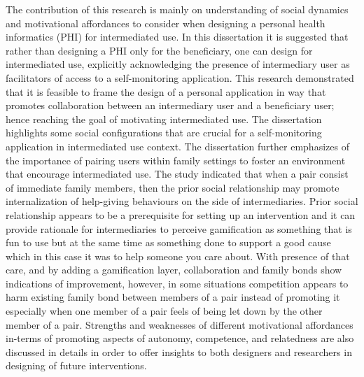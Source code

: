 The contribution of this research is mainly on understanding of social dynamics and motivational affordances to consider when designing a personal health informatics (PHI) for intermediated use. In this dissertation it is suggested that rather than designing a PHI only for the beneficiary, one can design for intermediated use, explicitly acknowledging the presence of intermediary user as facilitators of access to a self-monitoring application. This research demonstrated that it is feasible to frame the design of a personal application in way that promotes collaboration between an intermediary user and a beneficiary user; hence reaching the goal of motivating intermediated use. The dissertation highlights some social configurations that are crucial for a self-monitoring application in intermediated use context. The dissertation further emphasizes of the importance of pairing users within family settings to foster an environment that encourage intermediated use.  The study indicated that when a pair consist of immediate family members, then the prior social relationship may promote internalization of help-giving behaviours on the side of intermediaries. Prior social relationship appears to be a prerequisite for setting up an intervention and it can provide rationale for intermediaries to perceive gamification as something that is fun to use but at the same time as something done to support a good cause which in this case it was to help someone you care about. With presence of that care, and by adding a gamification layer,  collaboration and family bonds show indications of improvement, however, in some situations competition appears to harm existing family bond between members of a pair instead of promoting it especially when one member of a pair feels of being let down by the other member of a pair. Strengths and weaknesses of different motivational affordances in-terms of promoting aspects of autonomy, competence, and relatedness are also discussed in details in order to offer insights to both designers and researchers in designing of future interventions.
